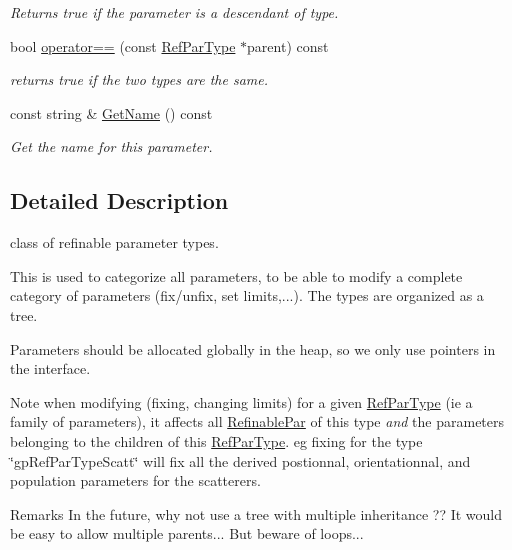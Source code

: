 \begin{DoxyCompactItemize}
\begin{DoxyCompactList}\small\item\em Returns true if the parameter is a descendant of \textquotesingle{}type\textquotesingle{}. \end{DoxyCompactList}\item 
\mbox{\label{class_obj_cryst_1_1_ref_par_type_a948f7230cbda1e08cc11f3134e6116ef}} 
bool \mbox{\hyperlink{class_obj_cryst_1_1_ref_par_type_a948f7230cbda1e08cc11f3134e6116ef}{operator==}} (const \mbox{\hyperlink{class_obj_cryst_1_1_ref_par_type}{Ref\+Par\+Type}} $\ast$parent) const
\begin{DoxyCompactList}\small\item\em returns true if the two types are the same. \end{DoxyCompactList}\item 
\mbox{\label{class_obj_cryst_1_1_ref_par_type_a95425e10cdfcec4c4b1c41dc2d147039}} 
const string \& \mbox{\hyperlink{class_obj_cryst_1_1_ref_par_type_a95425e10cdfcec4c4b1c41dc2d147039}{Get\+Name}} () const
\begin{DoxyCompactList}\small\item\em Get the name for this parameter. \end{DoxyCompactList}\end{DoxyCompactItemize}


\subsection{Detailed Description}
class of refinable parameter types. 

This is used to categorize all parameters, to be able to modify a complete category of parameters (fix/unfix, set limits,...). The types are organized as a tree.

Parameters should be allocated globally in the heap, so we only use pointers in the interface.

\begin{DoxyNote}{Note}
when modifying (fixing, changing limits) for a given \mbox{\hyperlink{class_obj_cryst_1_1_ref_par_type}{Ref\+Par\+Type}} (ie a \textquotesingle{}family\textquotesingle{} of parameters), it affects all \mbox{\hyperlink{class_obj_cryst_1_1_refinable_par}{Refinable\+Par}} of this type {\itshape and} the parameters belonging to the children of this \mbox{\hyperlink{class_obj_cryst_1_1_ref_par_type}{Ref\+Par\+Type}}. eg fixing for the type \char`\"{}gp\+Ref\+Par\+Type\+Scatt\char`\"{} will fix all the derived postionnal, orientationnal, and population parameters for the scatterers.
\end{DoxyNote}
\begin{DoxyRemark}{Remarks}
In the future, why not use a tree with multiple inheritance ?? It would be easy to allow multiple parents... But beware of loops... 
\end{DoxyRemark}


